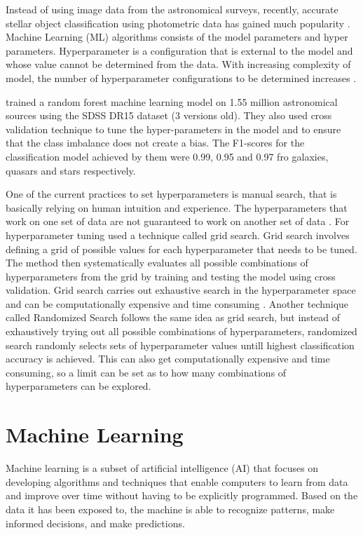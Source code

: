 Instead of using image data from the astronomical surveys, recently, accurate stellar object classification using photometric data has gained much popularity \citep{Wierzbiński}. 
Machine Learning (ML) algorithms consists of the model parameters and hyper parameters. Hyperparameter is a configuration that is external to the model and whose value cannot be determined from the data. With increasing complexity of model, the number of hyperparameter configurations to be determined increases \citep{Cui}.

\cite{Clarke2020} trained a random forest machine learning model on 1.55 million astronomical sources using the SDSS DR15 dataset (3 versions old). They also used cross validation technique to tune the hyper-parameters in the model and to ensure that the class imbalance does not create a bias. The F1-scores for the classification model achieved by them were 0.99, 0.95 and 0.97 fro galaxies, quasars and stars respectively. 

One of the current practices to set hyperparameters is manual search, that is basically relying on human intuition and experience. The hyperparameters that work on one set of data are not guaranteed to work on another set of data \citep{Young}. For hyperparameter tuning \cite{Clarke2020} used a technique called grid search. Grid search involves defining a grid of possible values for each hyperparameter that needs to be tuned. The method then systematically evaluates all possible combinations of hyperparameters from the grid by training and testing the model using cross validation. Grid search carries out exhaustive search in the hyperparameter space and can be computationally expensive and time consuming \citep{Clarke2020}. Another technique called Randomized Search follows the same idea as grid search, but instead of exhaustively trying out all possible combinations of hyperparameters, randomized search randomly selects sets of hyperparameter values untill highest classification accuracy is achieved. This can also get computationally expensive and time consuming, so a limit can be set as to how many combinations of hyperparameters can be explored.


\section{Machine Learning}

Machine learning is a subset of artificial intelligence (AI) that focuses on developing algorithms and techniques that enable computers to learn from data and improve over time without having to be explicitly programmed. Based on the data it has been exposed to, the machine is able to recognize patterns, make informed decisions, and make predictions.

